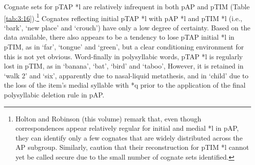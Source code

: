 \documentclass[output=paper]{LSP/langsci}
\begin{document}
Cognate sets for pTAP *l are relatively infrequent in both pAP and pTIM (Table \ref{tab:3:16}).\footnote{\textstylefootnotereference{ } Holton and Robinson (this volume) remark that, even though correspondences appear relatively regular for initial and medial *l in pAP, they can identify only a few cognates that are widely distributed across the AP subgroup. Similarly, \citet{SchapperEtAl2012} caution that their reconstruction for pTIM *l cannot yet be called secure due to the small number of cognate sets identified.} Cognates reflecting initial pTAP *l with pAP *l and pTIM *l (i.e., `bark', `new place' and `crouch') have only a low degree of certainty. Based on the data available, there also appears to be a tendency to lose pTAP initial *l in pTIM, as in `far', `tongue' and `green', but a clear conditioning environment for this is not yet obvious. Word-finally in polysyllabic words, pTAP *l is regularly lost in pTIM, as in `banana', `bat', `bird' and `taboo', However, it is retained in `walk 2' and `six', apparently due 
to nasal-liquid metathesis, and in `child' due to the loss of the item's medial syllable with *q prior to the application of the final polysyllabic deletion rule in pAP.

 
\end{document}
